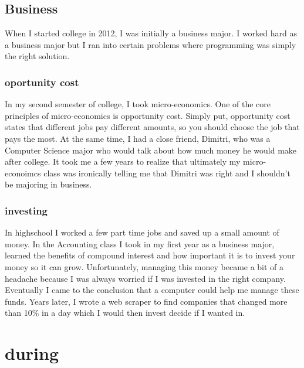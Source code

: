 \documentclass[titlepage]{article}
\begin{document}
\iffalse
\subsection{St. Luke's}

Most people in IT are into it from a young age, not me\dots
\fi

\subsection{Business}

When I started college in 2012, I was initially a business major. I worked hard as a business major but I ran into certain problems where programming was simply the right solution.

\subsubsection{oportunity cost}

In my second semester of college, I took micro-economics. One of the core principles of micro-economics is opportunity cost. Simply put, opportunity cost states that different jobs pay different amounts, so you should choose the job that pays the most. At the same time, I had a close friend, Dimitri, who was a Computer Science major who would talk about how much money he would make after college. It took me a few years to realize that ultimately my micro-econoimcs class was ironically telling me that Dimitri was right and I shouldn't be majoring in business.

\subsubsection{investing}

In highschool I worked a few part time jobs and saved up a small amount of money. In the Accounting class I took in my first year as a business major, learned the benefits of compound interest and how important it is to invest your money so it can grow. Unfortunately, managing this money became a bit of a headache because I was always worried if I was invested in the right company. Eventually I came to the conclusion that a computer could help me manage these funds. Years later, I wrote a web scraper to find companies that changed more than 10\% in a day which I would then invest decide if I wanted in.

\section{during}
\end{document}

